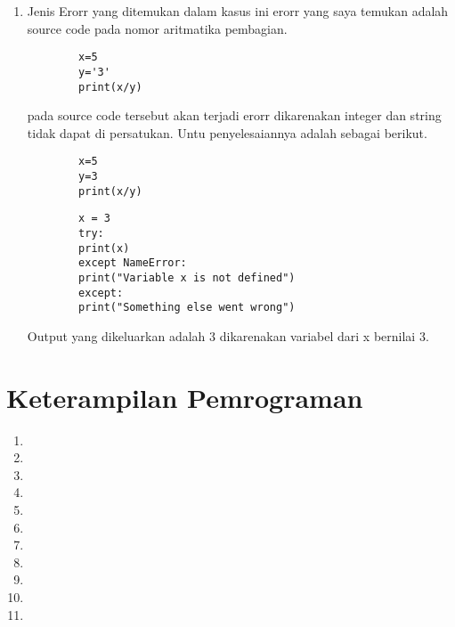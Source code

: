 \begin{enumerate}
\par
\item Jenis Erorr yang ditemukan
\subitem dalam kasus ini erorr yang saya temukan adalah source code pada nomor aritmatika pembagian.
	\begin{verbatim}
		x=5
		y='3'
		print(x/y)
	\end{verbatim}
\subitem pada source code tersebut akan terjadi erorr dikarenakan integer dan string tidak dapat di persatukan. Untu penyelesaiannya adalah sebagai berikut.
	\begin{verbatim}
		x=5
		y=3
		print(x/y)
	\end{verbatim}
\par
	\begin{verbatim}
		x = 3
		try:
		print(x)
		except NameError:
		print("Variable x is not defined")
		except:
		print("Something else went wrong")
	\end{verbatim}
\subitem Output yang dikeluarkan adalah 3 dikarenakan variabel dari x bernilai 3.
\end{enumerate}

\section{Keterampilan Pemrograman}
\begin{enumerate}
	\item 

	\item 

	\item 

	\item 

	\item 

	\item 

	\item 

	\item 

	\item 

	\item 
	
	\item 
\end{enumerate}


